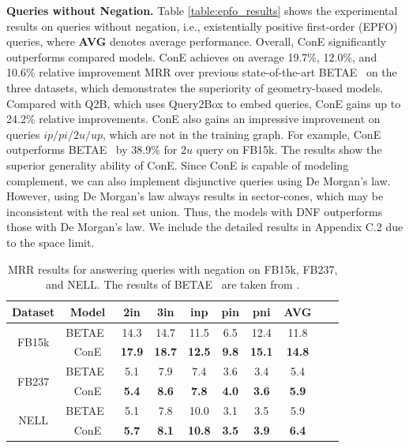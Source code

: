 \documentclass{article}
\newcommand{\betae}{{\normalsize{B}\footnotesize{ETA}\normalsize{E}}}
\begin{document}
\textbf{Queries without Negation.}
Table \ref{table:epfo_results} shows the experimental results on queries without negation, i.e., existentially positive first-order (EPFO) queries, where \textbf{AVG} denotes average performance.
Overall, ConE significantly outperforms compared models. ConE achieves on average 19.7\%, 12.0\%, and 10.6\% relative improvement MRR over previous state-of-the-art \betae~ on the three datasets, which demonstrates the superiority of geometry-based models. 
Compared with Q2B, which uses Query2Box to embed queries, ConE gains up to 24.2\% relative improvements. ConE also gains an impressive improvement on queries $ip/pi/2u/up$, which are not in the training graph. For example, ConE outperforms \betae~ by 38.9\% for $2u$ query on FB15k. The results show the superior generality ability of ConE.
Since ConE is capable of modeling complement, we can also implement disjunctive queries using De Morgan's law. However, using De Morgan's law always results in sector-cones, which may be inconsistent with the real set union. Thus, the models with DNF outperforms those with De Morgan's law. We include the detailed results in Appendix C.2 due to the space limit.


\begin{table}[t]
    \centering
    \caption{MRR results for answering queries with negation on FB15k, FB237, and NELL. The results of \betae~ are taken from \citet{beta}. }
    \label{table:negation_results}
    \vspace{1mm}
    \begin{tabular}{ c c  c c c c  c c c c }
        \toprule
         \textbf{Dataset} & \textbf{Model} &\textbf{2in} &\textbf{3in} &\textbf{inp} &\textbf{pin} &\textbf{pni} &\textbf{AVG}\\
        \midrule
        \multirow{2}{*}{FB15k} &\betae~ &14.3 &14.7 &11.5 &6.5 &12.4 &11.8\\
        &ConE &\textbf{17.9} &\textbf{18.7} &\textbf{12.5} &\textbf{9.8} &\textbf{15.1} &\textbf{14.8}\\
        \midrule
        \multirow{2}{*}{FB237}&\betae~ &5.1 &7.9 &7.4 &3.6 &3.4 &5.4\\
        &ConE &\textbf{5.4} &\textbf{8.6} &\textbf{7.8} &\textbf{4.0} &\textbf{3.6} &\textbf{5.9}\\
        \midrule
        \multirow{2}{*}{NELL} &\betae~ &5.1 &7.8 &10.0 &3.1 &3.5 &5.9\\
        &ConE &\textbf{5.7} &\textbf{8.1} &\textbf{10.8} &\textbf{3.5} &\textbf{3.9} &\textbf{6.4}\\
        \bottomrule
    \end{tabular}
    \vspace{-3mm}
\end{table}
\end{document}
